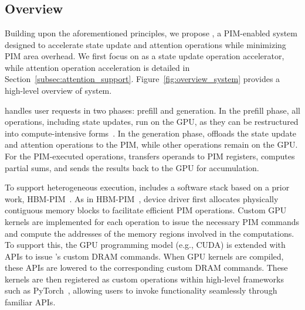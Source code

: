 \section{\sysname{}}
\label{sec:arch}

\subsection{Overview}
\label{subsec:system_overview}
%
Building upon the aforementioned principles, we propose \sysname{}, a
PIM-enabled system designed to accelerate state update and attention
operations while minimizing PIM area overhead.
%
We first focus on \sysname{} as a state update operation accelerator,
while attention operation acceleration is detailed in
Section~\ref{subsec:attention_support}.
%
Figure~\ref{fig:overview_system} provides a high-level overview of
\sysname{} system.
%

%
%
\sysname{} handles user requests in two phases: prefill and generation.
%
In the prefill phase, all operations, including state updates, run on
the GPU, as they can be restructured into compute-intensive
forms~\cite{retnet, mamba2}.
%
In the generation phase, \sysname{} offloads the state update and
attention operations to the PIM, while other operations remain on the GPU.
%
For the PIM-executed operations, \sysname{} transfers operands to PIM
registers, computes partial sums, and sends the results back to the
GPU for accumulation.
%

%
To support heterogeneous execution, \sysname{} includes a software
stack based on a prior work, HBM-PIM~\cite{hbm_pim}.
%
As in HBM-PIM~\cite{hbm_pim}, \sysname{} device driver first
allocates physically contiguous memory blocks to facilitate
efficient PIM operations.
%
Custom GPU kernels are implemented for each \sysname{} operation to
issue the necessary PIM commands and compute the addresses of the
memory regions involved in the computations.
%
To support this, the GPU programming model (e.g., CUDA) is extended
with APIs to issue \sysname{}'s custom DRAM commands.
%
When GPU kernels are compiled, these APIs are lowered to the
corresponding custom DRAM commands.
%
These kernels are then registered as custom operations within
high-level frameworks such as PyTorch~\cite{torch2}, allowing users
to invoke \sysname{} functionality seamlessly through familiar APIs.
%

